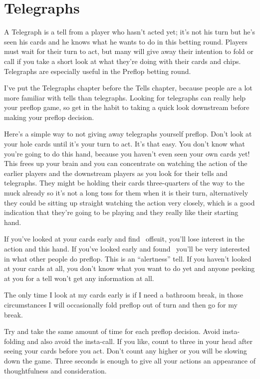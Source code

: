 \chapter{Telegraphs}


A Telegraph is a tell from a player who hasn't acted yet; it's not his
turn but he's seen his cards and he knows what he wants to do in this
betting round. Players must wait for their turn to act, but many will
give away their intention to fold or call if you take a short look at
what they're doing with their cards and chips. Telegraphs are
especially useful in the Preflop betting round.

I've put the Telegraphs chapter before the Tells chapter,
because people are a lot more familiar with tells than
telegraphs. Looking for telegraphs can really help your preflop game,
so get in the habit to taking a quick look downstream before
making your preflop decision.

Here's a simple way to not giving away telegraphs yourself preflop.
Don't look at your hole cards until it's your turn to act. It's that easy.
You don't know what you're going to do this hand, because
you haven't even seen your own cards yet! This frees up your brain
and you can concentrate on watching the action of the earlier players
and the downstream players as you look for their tells and telegraphs.
They might be holding their cards three-quarters of the way to the
muck already so it's not a long toss for them when it is their
turn, alternatively they could be sitting up straight watching
the action very closely, which is a good indication that they're
going to be playing and they really like their starting hand.

If you've looked at your cards early and find \sevh\trec\ offsuit,
you'll lose interest in the action and this hand. If you've looked
early and found \Kc\Ks\ you'll be very interested in what other people
do preflop. This is an ``alertness'' tell. If you haven't looked at
your cards at all, you don't know what you want to do yet and anyone
peeking at you for a tell won't get any information at all.

The only time I look at my cards early is if I need a bathroom break,
in those circumstances I will occasionally fold preflop out of turn
and then go for my break.

Try and take the same amount of time for each preflop decision.
Avoid insta-folding and also avoid the insta-call. If you like,
count to three in your head after seeing your cards before you act.
Don't count any higher or you will be slowing down the game. Three
seconds is enough to give all your actions an appearance of
thoughtfulness and consideration.


